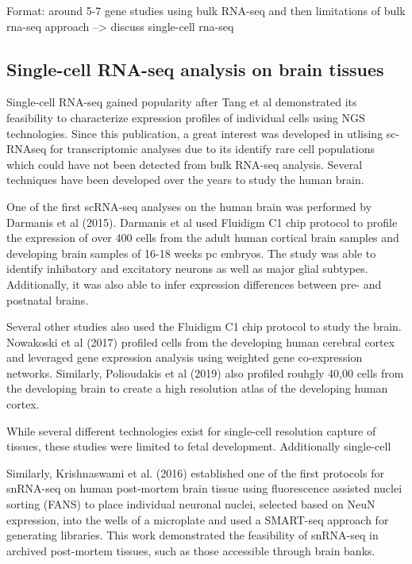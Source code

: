 \documentclass[12pt]{article}
\begin{document}
Format: around 5-7 gene studies using bulk RNA-seq and then limitations of bulk rna-seq approach --> discuss single-cell rna-seq

\subsection{Single-cell RNA-seq analysis on brain tissues}


Single-cell RNA-seq gained popularity after Tang et al demonstrated its feasibility to characterize expression profiles of individual cells using NGS technologies. Since this publication, a great interest was developed in utlising sc-RNAseq for transcriptomic analyses due to its identify rare cell populations which could have not been detected from bulk RNA-seq analysis.  Several techniques have been developed over the years to study the human brain. 

One of the first scRNA-seq analyses on the human brain was performed by Darmanis et al (2015). Darmanis et al used Fluidigm C1 chip protocol to profile the expression of over 400 cells from the adult human cortical brain samples and developing brain samples of 16-18 weeks pc embryos. The study was able to identify inhibatory and excitatory neurons as well as major glial subtypes. Additionally, it was also able to infer expression differences between pre- and postnatal brains.  

Several other studies also used the Fluidigm C1 chip protocol to study the brain. Nowakoski et al (2017) profiled cells from the developing human cerebral cortex and leveraged gene expression analysis using weighted gene co-expression networks. Similarly, Polioudakis et al (2019) also profiled rouhgly 40,00 cells from the developing brain to create a high resolution atlas of the developing human cortex. 

While several different technologies exist for single-cell resolution capture of tissues, these studies were limited to fetal development. Additionally single-cell 




Similarly,  Krishnaswami et al. (2016) established one of the first protocols for snRNA-seq on human post-mortem brain tissue using fluorescence assisted nuclei sorting (FANS) to place individual neuronal nuclei, selected based on NeuN expression, into the wells of a microplate and used a SMART-seq approach for generating libraries. This work demonstrated  the feasibility of snRNA-seq in archived post-mortem tissues, such as those accessible through brain banks.
\end{document}
